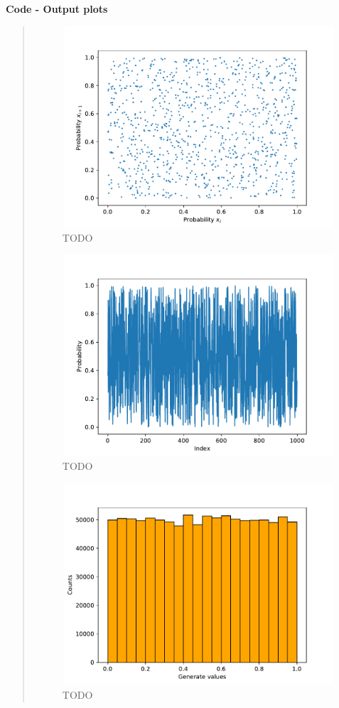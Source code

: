 \textbf{Code - Output plots}
\begin{quote}

\begin{figure}[!ht]
\centering
\includegraphics[width=12cm, height=7.5cm]{./Plots/1_plot_against.pdf}
\caption{TODO}
\end{figure}

\begin{figure}[!hb]
\centering
\includegraphics[width=12cm, height=7.5cm]{./Plots/1_plot_index.pdf}
\caption{TODO}
\end{figure}

\newpage
\begin{figure}[!ht]
\centering
\includegraphics[width=12cm, height=7.5cm]{./Plots/1_hist_uniformnes.pdf}
\caption{TODO}
\end{figure}
\end{quote}


